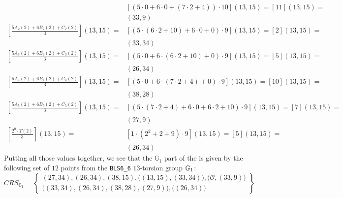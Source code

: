 \begin{example}
\begin{align*}
 & [(5\cdot 0 +6\cdot 0 + (7\cdot 2 + 4))\cdot 10](13,15) = [11](13,15) = \\
 & (33,9) \\
[\frac{5 A_{2}(2)+ 6 B_{2}(2) + C_{2}(2)}{3}](13,15) =
 & [(5\cdot (6\cdot 2 +10) +6\cdot 0 +0 )\cdot 9](13,15) = [2](13,15) = \\
 & (33,34) \\
[\frac{5 A_{3}(2)+ 6 B_{3}(2) + C_{3}(2)}{3}](13,15) =
 & [(5\cdot 0 +6\cdot (6\cdot 2 + 10) + 0 )\cdot 9](13,15) = [5](13,15) = \\
 & (26,34) \\
[\frac{5 A_{4}(2)+ 6 B_{4}(2) + C_{4}(2)}{3}](13,15) = 
 & [(5\cdot 0+6\cdot(7\cdot 2 +4)+0)\cdot 9](13,15) =[10](13,15) = \\
 & (38,28) \\
[\frac{5 A_{5}(2)+ 6 B_{5}(2) + C_{5}(2)}{3}](13,15) =
 & [(5\cdot (7\cdot 2 + 4) +6\cdot 0 + 6\cdot 2 + 10 )\cdot 9](13,15) = [7](13,15) = \\
 & (27,9)\\
[\frac{2^0\cdot T(2)}{3}](13,15) =
 & [1\cdot (2^2+2+9)\cdot 9](13,15)= [5](13,15) = \\
 & (26,34)
\end{align*}
Putting all those values together, we see that the $\mathbb{G}_1$ part of the  is given by the following set of $12$ points from the \texttt{BLS6\_6} $13$-torsion group $\mathbb{G}_1$: 
\begin{equation}
\label{eq:3-fac-groth-16-crs}
CRS_{\mathbb{G}_{1}}=\left\{ \begin{array}{c}
(27,34),(26,34),(38,15),\Big((13,15),(33,34)\Big),
\Big(\mathcal{O}, (33,9)\Big)\\
\Big((33,34),(26,34),(38,28),(27,9)\Big),
\Big((26,34)\Big)
\end{array}\right\}
\end{equation}


\end{example}
